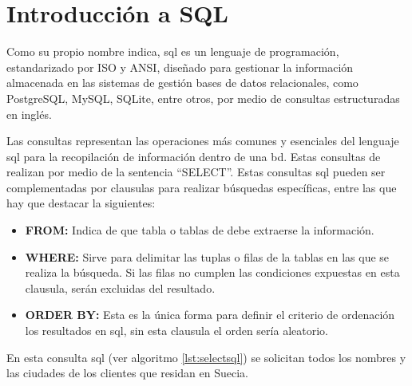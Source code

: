 \section{Introducción a SQL}

Como su propio nombre indica, \acrfull{sql} es un lenguaje de programación, estandarizado por ISO y ANSI, diseñado para gestionar la información almacenada en las sistemas de gestión bases de datos relacionales, como PostgreSQL\cite{PostgreSQL}, MySQL\cite{MySQL}, SQLite\cite{SQLite}, entre otros, por medio de consultas estructuradas en inglés.

Las consultas representan las operaciones más comunes y esenciales del lenguaje \acrshort{sql} para la recopilación de información dentro de una \acrshort{bd}. Estas consultas de realizan por medio de la sentencia ``SELECT''. Estas consultas \acrshort{sql} pueden ser complementadas por clausulas para realizar búsquedas específicas, entre las que hay que destacar la siguientes:

\begin{itemize}
	\item \textbf{FROM:} Indica de que tabla o tablas de debe extraerse la información.
	\item \textbf{WHERE:} Sirve para delimitar las tuplas o filas de la tablas en las que se realiza la búsqueda. Si las filas no cumplen las condiciones expuestas en esta clausula, serán excluidas del resultado.
	\item \textbf{ORDER BY:} Esta es la única forma para definir el criterio de ordenación los resultados en \acrshort{sql}, sin esta clausula el orden sería aleatorio.
\end{itemize}



En esta consulta \acrshort{sql} (ver algoritmo \ref{lst:selectsql}) se solicitan todos los nombres y las ciudades de los clientes que residan en Suecia.